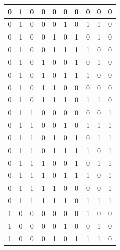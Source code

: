 \documentclass[fleqn]{article}
\begin{document}
\begin{latin}
\begin{center}
\begin{longtable}{|ccc|ccc||ccc|c|}
			0        & 1        & 0        & 0 & 0 & 0 & 0          & 0          & 0          & 0   \\ \hline
			0        & 1        & 0        & 0 & 0 & 1 & 0          & 1          & 1          & 0   \\ \hline
			0        & 1        & 0        & 0 & 1 & 0 & 1          & 0          & 1          & 0   \\ \hline
			0        & 1        & 0        & 0 & 1 & 1 & 1          & 1          & 0          & 0   \\ \hline
			0        & 1        & 0        & 1 & 0 & 0 & 1          & 0          & 1          & 0   \\ \hline
			0        & 1        & 0        & 1 & 0 & 1 & 1          & 1          & 0          & 0   \\ \hline
			0        & 1        & 0        & 1 & 1 & 0 & 0          & 0          & 0          & 0   \\ \hline
			0        & 1        & 0        & 1 & 1 & 1 & 0          & 1          & 1          & 0   \\ \hline
			0        & 1        & 1        & 0 & 0 & 0 & 0          & 0          & 0          & 1   \\ \hline
			0        & 1        & 1        & 0 & 0 & 1 & 0          & 1          & 1          & 1   \\ \hline
			0        & 1        & 1        & 0 & 1 & 0 & 1          & 0          & 1          & 1   \\ \hline
			0        & 1        & 1        & 0 & 1 & 1 & 1          & 1          & 0          & 1   \\ \hline
			0        & 1        & 1        & 1 & 0 & 0 & 1          & 0          & 1          & 1   \\ \hline
			0        & 1        & 1        & 1 & 0 & 1 & 1          & 1          & 0          & 1   \\ \hline
			0        & 1        & 1        & 1 & 1 & 0 & 0          & 0          & 0          & 1   \\ \hline
			0        & 1        & 1        & 1 & 1 & 1 & 0          & 1          & 1          & 1   \\ \hline
			1        & 0        & 0        & 0 & 0 & 0 & 0          & 1          & 0          & 0   \\ \hline
			1        & 0        & 0        & 0 & 0 & 1 & 0          & 0          & 1          & 0   \\ \hline
			1        & 0        & 0        & 0 & 1 & 0 & 1          & 1          & 1          & 0   \\ \hline

\end{longtable}
\end{center}
\end{latin}
\end{document}
